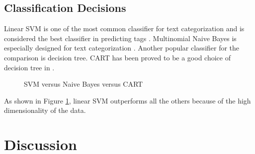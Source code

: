 \documentclass{sig-alternate-05-2015}
\begin{document}
\subsection{Classification Decisions}

Linear SVM is one of the most common classifier for text categorization \cite{joachims2006training} and is considered the best classifier in predicting tags \cite{moharanatag}. Multinomial Naive Bayes is especially designed for text categorization \cite{mccallum1998comparison}. Another popular classifier for the comparison is decision tree. CART has been proved to be a good choice of decision tree in \cite{miotto2005supporting}.

\begin{figure}[ht]
    \centering
    \quad
    \quad
    \caption{SVM versus Naive Bayes versus CART}
    \label{fig:algms}
\end{figure}

As shown in Figure \ref{fig:algms}, linear SVM outperforms all the others because of the high dimensionality of the data.

\section{Discussion}
\label{sec:Discussion}
\end{document}
